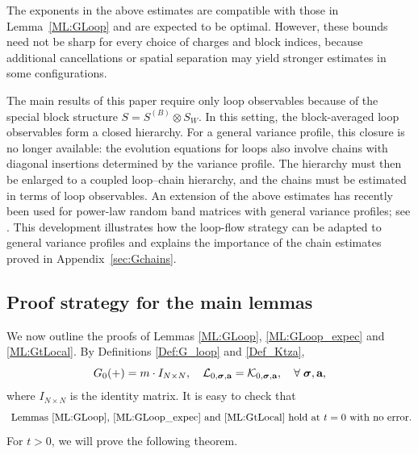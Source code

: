 \documentclass[10pt,reqno]{article}
\theoremstyle{plain} %
\theoremstyle{remark}
\numberwithin{equation}{section}
\begin{document}
The exponents in the above estimates are compatible with those in Lemma~\ref{ML:GLoop} and are expected to be optimal.
However, these bounds need not be sharp for every choice of charges and block indices, because additional cancellations or spatial separation may yield stronger estimates in some configurations.

The main results of this paper require only loop observables because of the special block structure
$S=S^{(B)}\otimes S_W$. In this setting, the block-averaged loop observables form a closed hierarchy. For a general variance profile, this closure is no longer available: the evolution equations for loops also involve chains with diagonal insertions determined by the variance profile.
The hierarchy must then be enlarged to a coupled loop--chain hierarchy, and the chains must be estimated in terms of loop observables. An extension of the above estimates has recently been used for power-law random band matrices with general variance profiles; see
\cite[Section~9]{FanYangYin2026PowerLawRBM}. This development illustrates how the loop-flow strategy can be adapted to general variance profiles and explains the importance of the chain estimates proved in Appendix~\ref{sec:Gchains}.

 

\subsection{Proof strategy for the main lemmas}

We now outline the proofs of Lemmas \ref{ML:GLoop}, \ref{ML:GLoop_expec} and \ref{ML:GtLocal}.
By Definitions \ref{Def:G_loop} and \ref{Def_Ktza},   
$$
G_{0}(+)=m\cdot I_{N\times N}, \quad {\cal L}_{0, \boldsymbol{\sigma},\textbf{a}}= {\cal K}_{0, \boldsymbol{\sigma},\textbf{a}},\quad \forall \; \boldsymbol{\sigma},\textbf{a}, 
$$
where $I_{N\times N}$ is the identity matrix. It is easy to check that  
\begin{align}\label{ini)bigasya}
    \hbox{    Lemmas \ref{ML:GLoop}, \ref{ML:GLoop_expec} and \ref{ML:GtLocal} hold at  $t=0$ with no error.}
\end{align}
For $t>0$, we will prove the following theorem.
\end{document}

